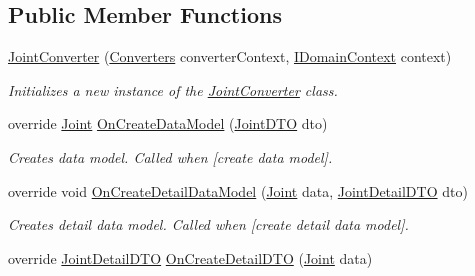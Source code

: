 \subsection*{Public Member Functions}
\begin{DoxyCompactItemize}
\item 
\mbox{\hyperlink{class_bar_none_1_1_shared_1_1_data_converters_1_1_joint_converter_aeb8506a4fa2deba3c52978c87fc3f413}{Joint\+Converter}} (\mbox{\hyperlink{class_bar_none_1_1_shared_1_1_data_converters_1_1_converters}{Converters}} converter\+Context, \mbox{\hyperlink{interface_bar_none_1_1_shared_1_1_core_1_1_i_domain_context}{I\+Domain\+Context}} context)
\begin{DoxyCompactList}\small\item\em Initializes a new instance of the \mbox{\hyperlink{class_bar_none_1_1_shared_1_1_data_converters_1_1_joint_converter}{Joint\+Converter}} class. \end{DoxyCompactList}\item 
override \mbox{\hyperlink{class_bar_none_1_1_shared_1_1_domain_model_1_1_joint}{Joint}} \mbox{\hyperlink{class_bar_none_1_1_shared_1_1_data_converters_1_1_joint_converter_a55c5ec09a41873bf5ead386a9bcd3973}{On\+Create\+Data\+Model}} (\mbox{\hyperlink{class_bar_none_1_1_shared_1_1_data_transfer_1_1_joint_d_t_o}{Joint\+D\+TO}} dto)
\begin{DoxyCompactList}\small\item\em Creates data model. Called when \mbox{[}create data model\mbox{]}. \end{DoxyCompactList}\item 
override void \mbox{\hyperlink{class_bar_none_1_1_shared_1_1_data_converters_1_1_joint_converter_ac52ff510b3f9b707954ef574efc78497}{On\+Create\+Detail\+Data\+Model}} (\mbox{\hyperlink{class_bar_none_1_1_shared_1_1_domain_model_1_1_joint}{Joint}} data, \mbox{\hyperlink{class_bar_none_1_1_shared_1_1_data_transfer_1_1_joint_detail_d_t_o}{Joint\+Detail\+D\+TO}} dto)
\begin{DoxyCompactList}\small\item\em Creates detail data model. Called when \mbox{[}create detail data model\mbox{]}. \end{DoxyCompactList}\item 
override \mbox{\hyperlink{class_bar_none_1_1_shared_1_1_data_transfer_1_1_joint_detail_d_t_o}{Joint\+Detail\+D\+TO}} \mbox{\hyperlink{class_bar_none_1_1_shared_1_1_data_converters_1_1_joint_converter_a07456561beccdf86fb371a54795af141}{On\+Create\+Detail\+D\+TO}} (\mbox{\hyperlink{class_bar_none_1_1_shared_1_1_domain_model_1_1_joint}{Joint}} data)

\end{DoxyCompactItemize}
